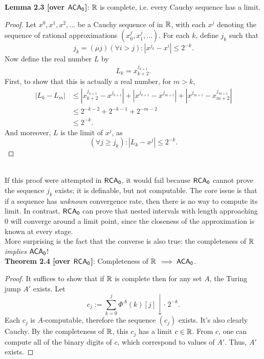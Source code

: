 \documentclass{amsart}
\begin{document}
	\noindent \textbf{Lemma 2.3 [over $\operatorname{\sf{ACA_0}}$]}: $\mathbb{R}$ is complete, i.e. every Cauchy sequence has a limit.
	\begin{proof}
		Let $x^0,x^1,x^2,\dots$ be a Cauchy sequence of in $\mathbb{R}$, with each $x^j$ denoting the sequence of rational approximations $(x^j_0,x^j_1,\dots)$. For each $k$, define $j_k$ such that
		$$
		j_k = (\mu j) (\forall i>j): |x^{j_k}-x^i|\leq 2^{-k}.
		$$
		Now define the real number $L$ by
		$$
		L_k = x^{j_{k+1}}_{k+2}.
		$$
		First, to show that this is actually a real number, for $m>k$,
		\begin{align*}
			|L_k - L_{m}| &\leq |x^{j_{k+1}}_{k+2} - x^{j_{k+1}}| + |x^{j_{k+1}} - x^{j_{m+1}}| + |x^{j_{m+1}}- x^{j_{m+1}}_{m+2}| \\
			&\leq 2^{-k-2}+2^{-k-1}+2^{-m-2} \\
			&\leq 2^{-k}.
		\end{align*}
		And moreover, $L$ is the limit of $x^j$, as 
		$$
		(\forall j\geq j_{k}): |L_k-x^{j}| \leq 2^{-k}.
		$$
	\end{proof}\\
	
	If this proof were attempted in $\operatorname{\sf{RCA_0}}$, it would fail because $\operatorname{\sf{RCA_0}}$ cannot prove the sequence $j_k$ exists; it is definable, but not computable. The core issue is that if a sequence has \textit{unknown} convergence rate, then there is no way to compute its limit. In contrast, $\operatorname{\sf{RCA_0}}$ can prove that nested intervals with length approaching 0 will converge around a limit point, since the closeness of the approximation is known at every stage.\\
	
	More surprising is the fact that the converse is also true: the completeness of $\mathbb{R}$ \textit{implies} $\operatorname{\sf{ACA_0}}$!\\
	
	
	\noindent \textbf{Theorem 2.4 [over $\operatorname{\sf{RCA_0}}$]}: Completeness of $\mathbb{R}$ $\implies \operatorname{\sf{ACA_0}}$.
	\begin{proof}
		It suffices to show that if $\mathbb{R}$ is complete then for any set $A$, the Turing jump $A'$ exists. Let 
		$$
		c_j := \sum_{k=0}^j \Phi^A(k)[j]\downarrow \cdot\; 2^{-k}.
		$$
		Each $c_j$ is $A$-computable, therefore the sequence $(c_j)$ exists. It's also clearly Cauchy. By the completeness of $\mathbb{R}$, this $c_j$ has a limit $c\in \mathbb{R}$. From $c$, one can compute all of the binary digits of $c$, which correspond to values of $A'$. Thus, $A'$ exists.
	\end{proof}\\
	
\end{document}

